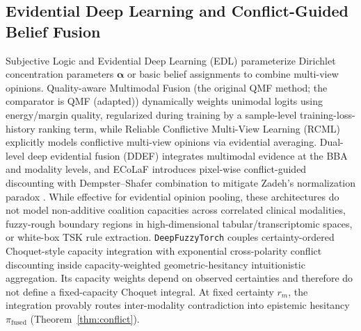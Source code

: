 \documentclass[10pt,twocolumn]{article}
\begin{document}
\subsection{Evidential Deep Learning and Conflict-Guided Belief Fusion}
Subjective Logic and Evidential Deep Learning (EDL)
\cite{sensoy2018evidential,han2022trusted,shao2024dual,xu2024reliable} parameterize Dirichlet
concentration parameters
$\bm{\alpha}$ or basic belief assignments to combine multi-view opinions. Quality-aware
Multimodal Fusion (the original QMF method; the comparator is QMF (adapted))
\cite{zhang2023provable} dynamically weights unimodal logits using energy/margin quality,
regularized during training by a sample-level training-loss-history ranking term, while
Reliable Conflictive Multi-View Learning
(RCML) \cite{xu2024reliable} explicitly models conflictive multi-view opinions via evidential
averaging. Dual-level deep evidential fusion (DDEF) \cite{shao2024dual} integrates multimodal
evidence at the BBA and modality levels, and ECoLaF \cite{deregnaucourt2025ecolaf} introduces
pixel-wise conflict-guided discounting with Dempster--Shafer combination to mitigate Zadeh's
normalization paradox \cite{zadeh1986simple}. While effective for evidential opinion pooling,
these architectures do not model non-additive coalition capacities across correlated clinical
modalities, fuzzy-rough boundary regions in high-dimensional tabular/transcriptomic spaces, or
white-box TSK rule extraction. \texttt{DeepFuzzyTorch} couples certainty-ordered
Choquet-style capacity integration \cite{choquet1954theory,xu2010choquet} with exponential
cross-polarity conflict discounting inside capacity-weighted geometric-hesitancy intuitionistic
aggregation. Its capacity weights depend on observed certainties and therefore do not define a
fixed-capacity Choquet integral. At fixed certainty $r_m$, the integration provably routes
inter-modality contradiction into epistemic hesitancy $\pi_{\text{fused}}$
(Theorem~\ref{thm:conflict}).
\end{document}
